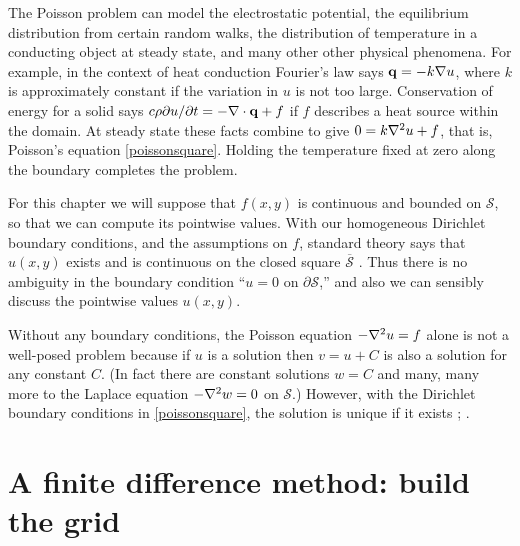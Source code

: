 The Poisson problem can model the electrostatic potential, the equilibrium distribution from certain random walks, the distribution of temperature in a conducting object at steady state, and many other other physical phenomena.  For example, in the context of heat conduction Fourier's law says $\mathbf{q} = -k \nabla u$, where $k$ is approximately constant if the variation in $u$ is not too large.  Conservation of energy for a solid says $c\rho \partial u/\partial t = - \nabla\cdot\mathbf{q} + f$ if $f$ describes a heat source within the domain.  At steady state these facts combine to give $0 = k \nabla^2 u + f$, that is, Poisson's equation \eqref{poissonsquare}.  Holding the temperature fixed at zero along the boundary completes the problem.

For this chapter we will suppose that $f(x,y)$ is continuous and bounded on $\mathcal{S}$, so that we can compute its pointwise values.  With our homogeneous Dirichlet boundary conditions, and the assumptions on $f$, standard theory says that $u(x,y)$ exists and is continuous on the closed square $\overline{\mathcal{S}}$ \citep[Theorem 6 in section 5.6]{Evans}.  Thus there is no ambiguity in the boundary condition ``$u=0$ on $\partial \mathcal{S}$,'' and also we can sensibly discuss the pointwise values $u(x,y)$.

Without any boundary conditions, the Poisson equation $-\nabla^2 u = f$ alone is not a well-posed problem because if $u$ is a solution then $v=u+C$ is also a solution for any constant $C$.  (In fact there are constant solutions $w=C$ and many, many more to the Laplace equation $-\nabla^2 w = 0$ on $\mathcal{S}$.)  However, with the Dirichlet boundary conditions in \eqref{poissonsquare}, the solution is unique if it exists \citep[Theorem 5 in section 2.2]{Evans}; \citep[subsection 5.2.1]{Ockendonetal2003}.



\section{A finite difference method: build the grid}

